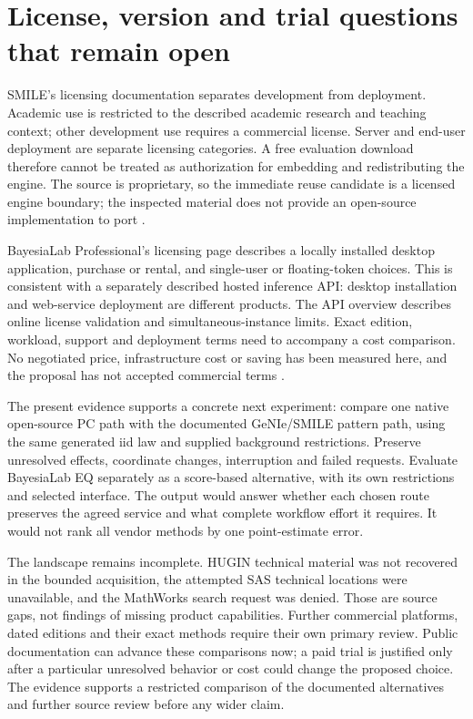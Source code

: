 \section{License, version and trial questions that remain open}

SMILE's licensing documentation separates development from deployment.
Academic use is restricted to the described academic research and teaching
context; other development use requires a commercial license. Server and
end-user deployment are separate licensing categories. A free evaluation
download therefore cannot be treated as authorization for embedding and
redistributing the engine. The source is proprietary, so the immediate reuse
candidate is a licensed engine boundary; the inspected material does not
provide an open-source implementation to port
\citep{exec13_smile_license}.

BayesiaLab Professional's licensing page describes a locally installed desktop
application, purchase or rental, and single-user or floating-token choices.
This is consistent with a separately described hosted inference API: desktop
installation and web-service deployment are different products. The API
overview describes online license validation and simultaneous-instance limits.
Exact edition, workload, support and deployment terms need to accompany a
cost comparison. No negotiated price, infrastructure cost or saving has been
measured here, and the proposal has not accepted commercial terms
\citep{exec13_bayesia_professional,exec13_bayesia_api}.

The present evidence supports a concrete next experiment: compare one
native open-source PC path with the documented GeNIe/SMILE pattern path,
using the same generated iid law and supplied background restrictions.
Preserve unresolved effects, coordinate changes, interruption and failed
requests. Evaluate BayesiaLab EQ separately as a score-based alternative,
with its own restrictions and selected interface. The output would answer
whether each chosen route preserves the agreed service and what complete
workflow effort it requires. It would not rank all vendor methods by one
point-estimate error.

The landscape remains incomplete. HUGIN technical material was not recovered
in the bounded acquisition, the attempted SAS technical locations were
unavailable, and the MathWorks search request was denied. Those are source
gaps, not findings of missing product capabilities. Further commercial
platforms, dated editions and their exact methods require their own primary
review. Public documentation can advance these comparisons now; a paid
trial is justified only after a particular unresolved behavior or cost could
change the proposed choice. The evidence supports a restricted comparison
of the documented alternatives and further source review before any wider claim.
\label{exec13:commercial-end}
